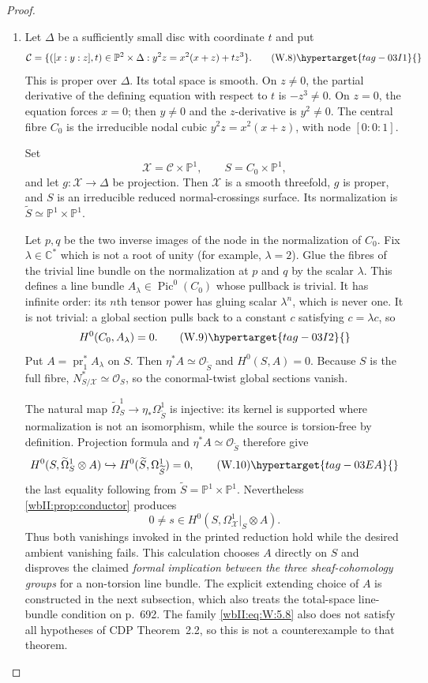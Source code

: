 \begin{proof}
\begin{enumerate}[label={$\langle1\rangle$\arabic*.},leftmargin=*]
\item 
Let $\Delta$ be a sufficiently small disc with coordinate $t$ and put
\[
\mathcal C=
\{([x:y:z],t)\in\mathbb P^2\times\Delta:
y^2z=x^2(x+z)+tz^3\}.
\tag{W.8}\hypertarget{tag-03I1}{}\label{wbII:eq:W:5.8}
\]
This is proper over $\Delta$.  Its total space is smooth.  On $z\ne0$, the
partial derivative of the defining equation with respect to $t$ is
$-z^3\ne0$.  On $z=0$, the equation forces $x=0$; then $y\ne0$ and the
$z$-derivative is $y^2\ne0$.  The central fibre $C_0$ is the irreducible
nodal cubic $y^2z=x^2(x+z)$, with node $[0:0:1]$.

Set
\[
\mathcal X=\mathcal C\times\mathbb P^1,\qquad
S=C_0\times\mathbb P^1,
\]
and let $g:\mathcal X\to\Delta$ be projection.  Then $\mathcal X$ is a
smooth threefold, $g$ is proper, and $S$ is an irreducible reduced
normal-crossings surface.  Its normalization is
$\widetilde S\simeq\mathbb P^1\times\mathbb P^1$.

Let $p,q$ be the two inverse images of the node in the normalization of
$C_0$.  Fix $\lambda\in\mathbb C^*$ which is not a root of unity (for
example, $\lambda=2$).  Glue the fibres of
the trivial line bundle on the normalization at $p$ and $q$ by the scalar
$\lambda$.  This defines a line bundle
$A_\lambda\in\operatorname{Pic}^0(C_0)$ whose pullback is trivial.  It has
infinite order: its $n$th tensor power has gluing scalar $\lambda^n$, which
is never one.  It is not trivial: a global section pulls back to a constant
$c$ satisfying
$c=\lambda c$, so
\[
H^0(C_0,A_\lambda)=0.
\tag{W.9}\hypertarget{tag-03I2}{}\label{wbII:eq:W:5.9}
\]
Put $A=\operatorname{pr}_1^*A_\lambda$ on $S$.  Then
$\eta^*A\simeq\mathcal O_{\widetilde S}$ and $H^0(S,A)=0$.
Because $S$ is the full fibre,
$N^*_{S/\mathcal X}\simeq\mathcal O_S$, so the conormal-twist global
sections vanish.

The natural map
$\widetilde\Omega^1_S\to\eta_*\Omega^1_{\widetilde S}$ is injective:
its kernel is supported where normalization is not an isomorphism, while
the source is torsion-free by definition.  Projection formula and
$\eta^*A\simeq\mathcal O_{\widetilde S}$ therefore give
\[
H^0(S,\widetilde\Omega^1_S\otimes A)
\hookrightarrow
H^0(\widetilde S,\Omega^1_{\widetilde S})=0,
\tag{W.10}\hypertarget{tag-03EA}{}\label{wbII:eq:W:5.10}
\]
the last equality following from
$\widetilde S=\mathbb P^1\times\mathbb P^1$.
Nevertheless \cref{wbII:prop:conductor} produces
\[
0\ne s\in H^0(S,\Omega^1_{\mathcal X}|_S\otimes A).
\]
Thus both vanishings invoked in the printed reduction hold while the desired
ambient vanishing fails.  This calculation chooses $A$ directly on $S$ and disproves the
claimed \emph{formal implication between the three sheaf-cohomology groups}
for a non-torsion line bundle. The explicit extending choice of $A$ is
constructed in the next subsection, which also treats the total-space
line-bundle condition on p.~692.  The family \eqref{wbII:eq:W:5.8} also does not satisfy all hypotheses of CDP
Theorem~2.2, so this is not a counterexample to that theorem.


\end{enumerate}
\end{proof}
